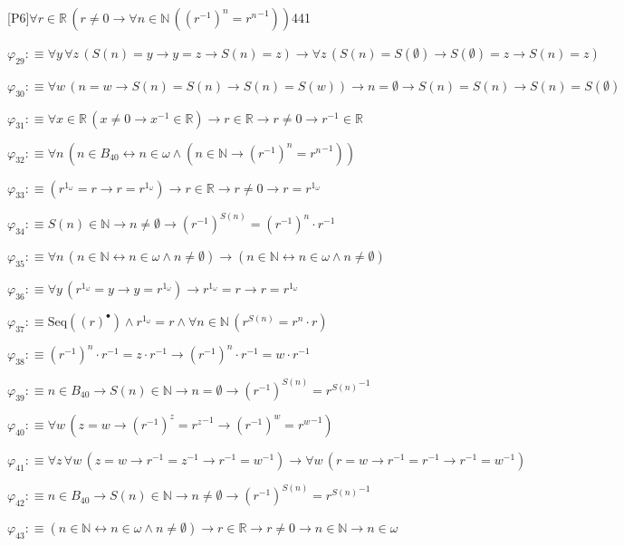 \begin{fullproof}{[P6]}{$\forall r \in \mathbb{R}\,(r \neq 0 \to \forall n \in \mathbb{N}\,({{(r^{-1})}^{n}} = {{r}^{n}}^{-1}))$}{441}
\begin{abbrevlist}
\item $\varphi_{29} :\equiv \forall y\,\forall z\,(S(n) = y \to y = z \to S(n) = z) \to \forall z\,(S(n) = S(\emptyset) \to S(\emptyset) = z \to S(n) = z)$
\item $\varphi_{30} :\equiv \forall w\,(n = w \to S(n) = S(n) \to S(n) = S(w)) \to n = \emptyset \to S(n) = S(n) \to S(n) = S(\emptyset)$
\item $\varphi_{31} :\equiv \forall x \in \mathbb{R}\,(x \neq 0 \to x^{-1} \in \mathbb{R}) \to r \in \mathbb{R} \to r \neq 0 \to r^{-1} \in \mathbb{R}$
\item $\varphi_{32} :\equiv \forall n\,(n \in B_{40} \leftrightarrow n \in \omega \land (n \in \mathbb{N} \to {{(r^{-1})}^{n}} = {{r}^{n}}^{-1}))$
\item $\varphi_{33} :\equiv ({{r}^{1_{\omega}}} = r \to r = {{r}^{1_{\omega}}}) \to r \in \mathbb{R} \to r \neq 0 \to r = {{r}^{1_{\omega}}}$
\item $\varphi_{34} :\equiv S(n) \in \mathbb{N} \to n \neq \emptyset \to {{(r^{-1})}^{S(n)}} = {{(r^{-1})}^{n}} \cdot r^{-1}$
\item $\varphi_{35} :\equiv \forall n\,(n \in \mathbb{N} \leftrightarrow n \in \omega \land n \neq \emptyset) \to (n \in \mathbb{N} \leftrightarrow n \in \omega \land n \neq \emptyset)$
\item $\varphi_{36} :\equiv \forall y\,({{r}^{1_{\omega}}} = y \to y = {{r}^{1_{\omega}}}) \to {{r}^{1_{\omega}}} = r \to r = {{r}^{1_{\omega}}}$
\item $\varphi_{37} :\equiv \mathrm{Seq}({(r)^{\bullet}}) \land {{r}^{1_{\omega}}} = r \land \forall n \in \mathbb{N}\,({{r}^{S(n)}} = {{r}^{n}} \cdot r)$
\item $\varphi_{38} :\equiv {{(r^{-1})}^{n}} \cdot r^{-1} = z \cdot r^{-1} \to {{(r^{-1})}^{n}} \cdot r^{-1} = w \cdot r^{-1}$
\item $\varphi_{39} :\equiv n \in B_{40} \to S(n) \in \mathbb{N} \to n = \emptyset \to {{(r^{-1})}^{S(n)}} = {{r}^{S(n)}}^{-1}$
\item $\varphi_{40} :\equiv \forall w\,(z = w \to {{(r^{-1})}^{z}} = {{r}^{z}}^{-1} \to {{(r^{-1})}^{w}} = {{r}^{w}}^{-1})$
\item $\varphi_{41} :\equiv \forall z\,\forall w\,(z = w \to r^{-1} = z^{-1} \to r^{-1} = w^{-1}) \to \forall w\,(r = w \to r^{-1} = r^{-1} \to r^{-1} = w^{-1})$
\item $\varphi_{42} :\equiv n \in B_{40} \to S(n) \in \mathbb{N} \to n \neq \emptyset \to {{(r^{-1})}^{S(n)}} = {{r}^{S(n)}}^{-1}$
\item $\varphi_{43} :\equiv (n \in \mathbb{N} \leftrightarrow n \in \omega \land n \neq \emptyset) \to r \in \mathbb{R} \to r \neq 0 \to n \in \mathbb{N} \to n \in \omega$

\end{abbrevlist}
\end{fullproof}
